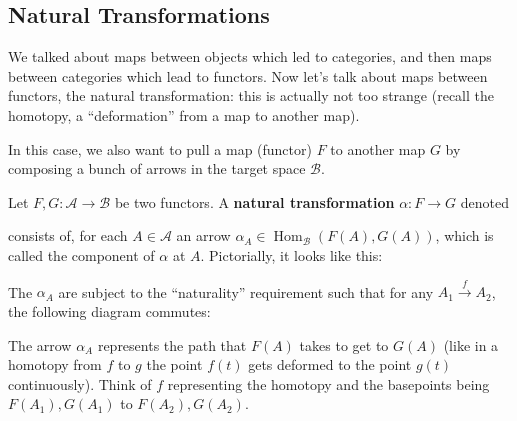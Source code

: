 \subsection{Natural Transformations}
We talked about maps between objects which led to categories, and then maps between categories which lead to functors. Now let's talk about maps between functors, the natural transformation: this is actually not too strange (recall the homotopy, a ``deformation'' from a map to another map).

In this case, we also want to pull a map (functor) $F$ to another map $G$ by composing a bunch of arrows in the target space $\mathcal{B}$.
\begin{definition}
    Let $F,G \colon \mathcal{A} \to \mathcal{B}$ be two functors. A \textbf{natural transformation} $\alpha \colon F \to G$ denoted
            \begin{figure}[H]
                \centering
            \end{figure}
            consists of, for each $A\in \mathcal{A}$ an arrow $\alpha_A \in \operatorname{Hom}_{\mathcal{B}}(F(A),G(A))$, which is called the component of $\alpha$ at $A$. 
            Pictorially, it looks like this: 
            \begin{figure}[H]
                \centering
            \end{figure}
            The $\alpha_A$ are subject to the ``naturality'' requirement such that for any $A_1 \overset{f}{\to }A_2$, the following diagram commutes:
            \begin{figure}[H]
                \centering
            \end{figure}
            The arrow $\alpha_A$ represents the path that $F(A)$ takes to get to $G(A)$ (like in a homotopy from $f$ to $g$ the point $f(t)$ gets deformed to the point $g(t)$ continuously). Think of $f$ representing the homotopy and the basepoints being $F(A_1),G(A_1)$ to $F(A_2),G(A_2)$.
\end{definition}
